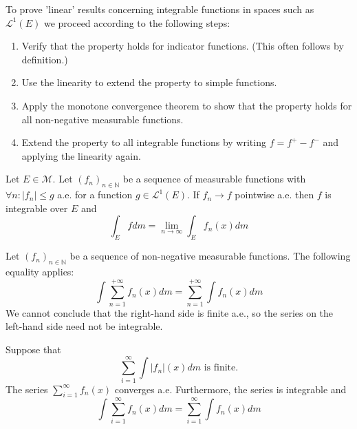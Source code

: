         \begin{method}
        	 \label{lebesgue:method:linear_proofs}
			To prove 'linear' results concerning integrable functions in spaces such as $\mathcal{L}^1(E)$ we proceed according to the following steps:
            \begin{enumerate}
            	\item Verify that the property holds for indicator functions. (This often follows by definition.)
                \item Use the linearity to extend the property to simple functions.
                \item Apply the monotone convergence theorem to show that the property holds for all non-negative measurable functions.
                \item Extend the property to all integrable functions by writing $f = f^+ - f^-$ and applying the linearity again.
			\end{enumerate}
		\end{method}
        
        \begin{theorem}
			Let $E\in\mathcal{M}$. Let $(f_n)_{n\in\mathbb{N}}$ be a sequence of measurable functions with $\forall n:|f_n|\leq g$ a.e. for a function $g\in\mathcal{L}^1(E)$. If $f_n\rightarrow f$ pointwise a.e. then $f$ is integrable over $E$ and
            \begin{equation}
				\label{lebesgue:theorem:dominated_convergence_theorem}
                \int_E fdm = \lim_{n\rightarrow\infty}\int_E f_n(x)dm
			\end{equation}
		\end{theorem}
        
        \begin{property}
			Let $(f_n)_{n\in\mathbb{N}}$ be a sequence of non-negative measurable functions. The following equality applies:
            \begin{equation}
				\int\sum_{n=1}^{+\infty}f_n(x)dm = \sum_{n=1}^{+\infty}\int f_n(x)dm
			\end{equation}
            We cannot conclude that the right-hand side is finite a.e., so the series on the left-hand side need not be integrable.
		\end{property}
        
        \begin{theorem}
			Suppose that
            \[\sum_{i=1}^\infty\int|f_n|(x)dm\text{ is finite.}\]
            The series $\sum_{i=1}^\infty f_n(x)$ converges a.e. Furthermore, the series is integrable and
            \begin{equation}
				\label{lebesgue:theorem:beppo_levi}
                \int\sum_{i=1}^\infty f_n(x)dm = \sum_{i=1}^\infty\int f_n(x)dm
			\end{equation}
		\end{theorem}
        
